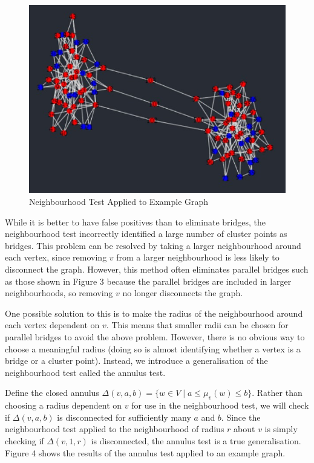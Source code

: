\documentclass[12pt,a4paper]{amsart}
\numberwithin{equation}{section}
\def\D{\Delta}
\theoremstyle{plain}
\theoremstyle{definition}
\begin{document}
\begin{figure}[h]
	\centering
	\caption{Neighbourhood Test Applied to Example Graph}
	\includegraphics[scale=0.8]{NeighbourhoodTest.jpg}
\end{figure}

While it is better to have false positives than to eliminate bridges, the neighbourhood test incorrectly identified a large number of cluster points as bridges. This problem can be resolved by taking a larger neighbourhood around each vertex, since removing $v$ from a larger neighbourhood is less likely to disconnect the graph. However, this method often eliminates parallel bridges such as those shown in Figure 3 because the parallel bridges are included in larger neighbourhoods, so removing $v$ no longer disconnects the graph.

One possible solution to this is to make the radius of the neighbourhood around each vertex dependent on $v$. This means that smaller radii can be chosen for parallel bridges to avoid the above problem. However, there is no obvious way to choose a meaningful radius (doing so is almost identifying whether a vertex is a bridge or a cluster point). Instead, we introduce a generalisation of the neighbourhood test called the annulus test. 

Define the closed annulus $\D(v,a,b) = \{w \in V \mid a \leq \mu_v(w) \leq b\}$. Rather than choosing a radius dependent on $v$ for use in the neighbourhood test, we will check if $\D(v,a,b)$ is disconnected for sufficiently many $a$ and $b$. Since the neighbourhood test applied to the neighbourhood of radius $r$ about $v$ is simply checking if $\D(v,1,r)$ is disconnected, the annulus test is a true generalisation. Figure 4 shows the results of the annulus test applied to an example graph.
\end{document}
